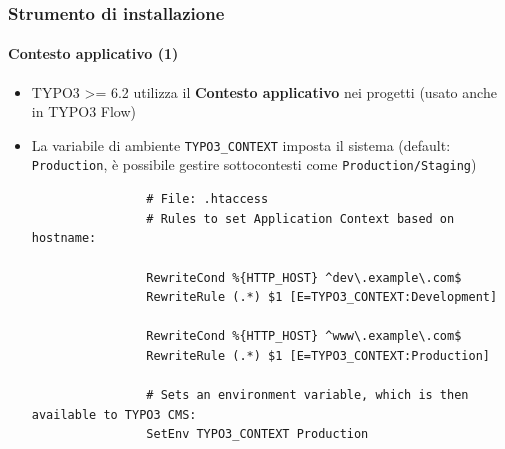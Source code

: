 
\begin{frame}[fragile]
	\frametitle{Strumento di installazione}
	\framesubtitle{Contesto applicativo (1)}

	\begin{itemize}
		\item TYPO3 >= 6.2 utilizza il \textbf{Contesto applicativo} nei progetti\newline
			\smaller(usato anche in TYPO3 Flow)\normalsize
		\item La variabile di ambiente \texttt{TYPO3\_CONTEXT} imposta il sistema\newline
			\smaller(default: \texttt{Production}, è possibile gestire sottocontesti come \texttt{Production/Staging})\normalsize

			\begin{lstlisting}
				# File: .htaccess
				# Rules to set Application Context based on hostname:

				RewriteCond %{HTTP_HOST} ^dev\.example\.com$
				RewriteRule (.*) $1 [E=TYPO3_CONTEXT:Development]

				RewriteCond %{HTTP_HOST} ^www\.example\.com$
				RewriteRule (.*) $1 [E=TYPO3_CONTEXT:Production]

				# Sets an environment variable, which is then available to TYPO3 CMS:
				SetEnv TYPO3_CONTEXT Production
			\end{lstlisting}

	\end{itemize}

\end{frame}


